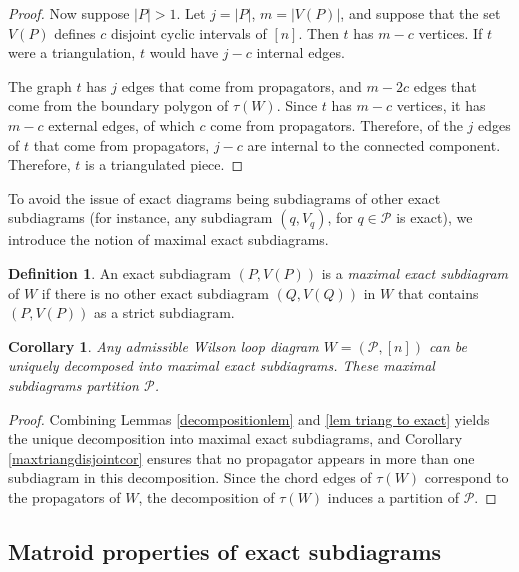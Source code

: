 \documentclass[11pt]{article}
\newcommand{\cP}{\mathcal{P}}
\newtheorem{cor}[thm]{Corollary}
\theoremstyle{remark}
\theoremstyle{definition}
\newtheorem{dfn}[thm]{Definition}
\begin{document}
\begin{proof}
Now suppose $|P|>1$.  Let $j=|P|$, $m=|V(P)|$, and 
suppose that the set $V(P)$ defines $c$ disjoint cyclic intervals of $[n]$. Then $t$ has $m-c$ vertices.  If $t$ were a triangulation, $t$ would have $j -c$ internal edges.

The graph $t$ has $j$ edges that come from propagators, and $m - 2c$ edges that come from the boundary polygon of $\tau(W)$. Since $t$ has $m-c$ vertices, it has $m-c$ external edges, of which $c$ come from propagators. Therefore, of the $j$ edges of $t$ that come from propagators, $j-c$ are internal to the connected component. Therefore, $t$ is a triangulated piece.


\end{proof}





To avoid the issue of exact diagrams being subdiagrams of other exact subdiagrams (for instance, any subdiagram $(q, V_q)$, for $q \in \cP$ is exact), we introduce the notion of maximal exact subdiagrams.

\begin{dfn}
An exact subdiagram $(P, V(P))$ is a {\em maximal exact subdiagram} of $W$ if there is no other exact subdiagram $(Q, V(Q))$ in $W$ that contains $(P,V(P))$ as a strict subdiagram.
\end{dfn}


\begin{cor} \label{uniqueproppartitioncor}
Any admissible Wilson loop diagram $W = (\cP, [n])$ can be uniquely decomposed into maximal exact subdiagrams. These maximal subdiagrams partition $\cP$.
\end{cor}

\begin{proof}
Combining Lemmas \ref{decompositionlem} and \ref{lem triang to exact} yields the unique decomposition into maximal exact subdiagrams, and Corollary \ref{maxtriangdisjointcor} ensures that no propagator appears in more than one subdiagram in this decomposition. Since the chord edges of $\tau(W)$ correspond to the propagators of $W$, the decomposition of $\tau(W)$ induces a partition of $\cP$.
\end{proof}

\subsection{Matroid properties of exact subdiagrams}
\end{document}
